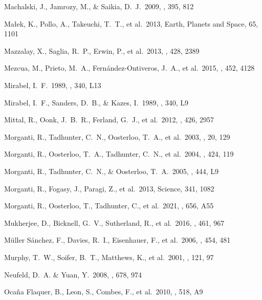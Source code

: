 \documentclass{aa}
\begin{document}
\begin{thebibliography}
 Machalski, J., Jamrozy, M., \& Saikia, D.~J.\ 2009, \mnras, 395, 812

 Ma{\l}ek, K., Pollo, A., Takeuchi, T.~T., et al.\ 2013, Earth, Planets and Space, 65, 1101

 Mazzalay, X., Saglia, R.~P., Erwin, P., et al.\ 2013, \mnras, 428, 2389


 Mezcua, M., Prieto, M.~A., Fern{\'a}ndez-Ontiveros, J.~A., et al.\ 2015, \mnras, 452, 4128

 Mirabel, I.~F.\ 1989, \apjl, 340, L13

 Mirabel, I.~F., Sanders, D.~B., \& Kazes, I.\ 1989, \apjl, 340, L9

 Mittal, R., Oonk, J.~B.~R., Ferland, G.~J., et al.\ 2012, \mnras, 426, 2957

 Morganti, R., Tadhunter, C.~N., Oosterloo, T.~A., et al.\ 2003, \pasa, 20, 129

 Morganti, R., Oosterloo, T.~A., Tadhunter, C.~N., et al.\ 2004, \aap, 424, 119

 Morganti, R., Tadhunter, C.~N., \& Oosterloo, T.~A.\ 2005, \aap, 444, L9

 Morganti, R., Fogasy, J., Paragi, Z., et al.\ 2013, Science, 341, 1082

 Morganti, R., Oosterloo, T., Tadhunter, C., et al.\ 2021, \aap, 656, A55

 Mukherjee, D., Bicknell, G.~V., Sutherland, R., et al.\ 2016, \mnras, 461, 967

 M{\"u}ller S{\'a}nchez, F., Davies, R.~I., Eisenhauer, F., et al.\ 2006, \aap, 454, 481



 Murphy, T.~W., Soifer, B.~T., Matthews, K., et al.\ 2001, \aj, 121, 97

 Neufeld, D.~A. \& Yuan, Y.\ 2008, \apj, 678, 974

 Oca{\~n}a Flaquer, B., Leon, S., Combes, F., et al.\ 2010, \aap, 518, A9


\end{thebibliography}
\end{document}
